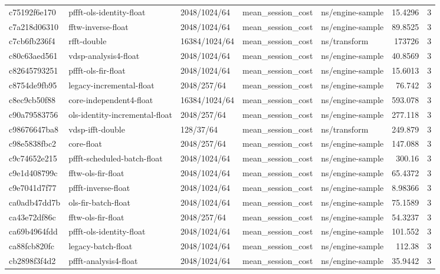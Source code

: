 \begin{longtable}{lllllrr}
c75192f6e170 & pffft-ols-identity-float & 2048/1024/64 & mean\_session\_cost & ns/engine-sample & 15.4296 & 3 \\
c7a218d06310 & fftw-inverse-float & 2048/1024/64 & mean\_session\_cost & ns/engine-sample & 89.8525 & 3 \\
c7cb6fb236f4 & rfft-double & 16384/1024/64 & mean\_session\_cost & ns/transform & 173726 & 3 \\
c80c63aed561 & vdsp-analysis4-float & 2048/1024/64 & mean\_session\_cost & ns/engine-sample & 40.8569 & 3 \\
c82645793251 & pffft-ols-fir-float & 2048/1024/64 & mean\_session\_cost & ns/engine-sample & 15.6013 & 3 \\
c8754de9fb95 & legacy-incremental-float & 2048/257/64 & mean\_session\_cost & ns/engine-sample & 76.742 & 3 \\
c8ec9cb50f88 & core-independent4-float & 16384/1024/64 & mean\_session\_cost & ns/engine-sample & 593.078 & 3 \\
c90a79583756 & ols-identity-incremental-float & 2048/257/64 & mean\_session\_cost & ns/engine-sample & 277.118 & 3 \\
c98676647ba8 & vdsp-ifft-double & 128/37/64 & mean\_session\_cost & ns/transform & 249.879 & 3 \\
c98e5838fbc2 & core-float & 2048/257/64 & mean\_session\_cost & ns/engine-sample & 147.088 & 3 \\
c9c74652e215 & pffft-scheduled-batch-float & 2048/1024/64 & mean\_session\_cost & ns/engine-sample & 300.16 & 3 \\
c9e1d408799c & fftw-ols-fir-float & 2048/1024/64 & mean\_session\_cost & ns/engine-sample & 65.4372 & 3 \\
c9e7041d7f77 & pffft-inverse-float & 2048/1024/64 & mean\_session\_cost & ns/engine-sample & 8.98366 & 3 \\
ca0adb47dd7b & ols-fir-batch-float & 2048/1024/64 & mean\_session\_cost & ns/engine-sample & 75.1589 & 3 \\
ca43e72df86c & fftw-ols-fir-float & 2048/257/64 & mean\_session\_cost & ns/engine-sample & 54.3237 & 3 \\
ca69b4964fdd & pffft-ols-identity-float & 2048/1024/64 & mean\_session\_cost & ns/engine-sample & 101.552 & 3 \\
ca88fcb820fc & legacy-batch-float & 2048/1024/64 & mean\_session\_cost & ns/engine-sample & 112.38 & 3 \\
cb2898f3f4d2 & pffft-analysis4-float & 2048/1024/64 & mean\_session\_cost & ns/engine-sample & 35.9442 & 3 \\

\end{longtable}
